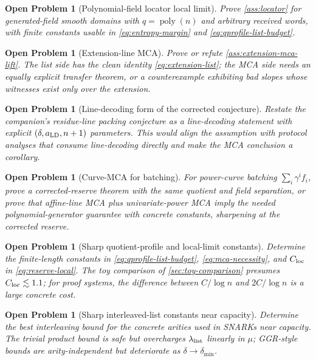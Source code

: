 \documentclass[11pt]{article}
\newtheorem{openproblem}[theorem]{Open Problem}
\theoremstyle{definition}
\newcommand{\poly}{\operatorname{poly}}
\begin{document}
\begin{openproblem}[Polynomial-field locator local limit]
\label{op:locator}
Prove \cref{ass:locator} for generated-field smooth domains with $q=\poly(n)$ and arbitrary received words, with finite constants usable in \eqref{eq:entropy-margin} and \eqref{eq:qprofile-list-budget}.
\end{openproblem}

\begin{openproblem}[Extension-line MCA]
\label{op:extension-mca}
Prove or refute \cref{ass:extension-mca-lift}.  The list side has the clean identity \eqref{eq:extension-list}; the MCA side needs an equally explicit transfer theorem, or a counterexample exhibiting bad slopes whose witnesses exist only over the extension.
\end{openproblem}

\begin{openproblem}[Line-decoding form of the corrected conjecture]
\label{op:line-decoding}
Restate the companion's residue-line packing conjecture as a line-decoding statement with explicit $(\delta,a_{\rm LD},n+1)$ parameters.  This would align the assumption with protocol analyses that consume line-decoding directly and make the MCA conclusion a corollary.
\end{openproblem}

\begin{openproblem}[Curve-MCA for batching]
\label{op:curve}
For power-curve batching $\sum_i\gamma^if_i$, prove a corrected-reserve theorem with the same quotient and field separation, or prove that affine-line MCA plus univariate-power MCA imply the needed polynomial-generator guarantee with concrete constants, sharpening \cite{BCGM25} at the corrected reserve.
\end{openproblem}

\begin{openproblem}[Sharp quotient-profile and local-limit constants]
\label{op:constants}
Determine the finite-length constants in \eqref{eq:qprofile-list-budget}, \eqref{eq:mca-necessity}, and $C_{\rm loc}$ in \eqref{eq:reserve-local}.  The toy comparison of \cref{sec:toy-comparison} presumes $C_{\rm loc}\lesssim1.1$; for proof systems, the difference between $C/\log n$ and $2C/\log n$ is a large concrete cost.
\end{openproblem}

\begin{openproblem}[Sharp interleaved-list constants near capacity]
\label{op:interleaving}
Determine the best interleaving bound for the concrete arities used in SNARKs near capacity.  The trivial product bound is safe but overcharges $\lambda_{\rm list}$ linearly in $\mu$; GGR-style bounds are arity-independent but deteriorate as $\delta\to\delta_{\min}$.
\end{openproblem}
\end{document}
